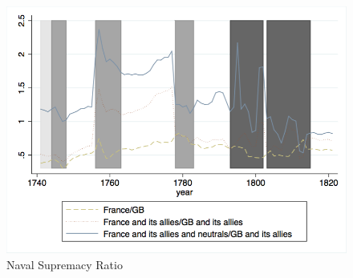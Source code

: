 \documentclass[12pt,a4paper,notitlepage,english]{article}
\begin{document}
\begin{center}
\begin{figure}[H]
\caption{Naval Supremacy Ratio}
\label{naval_supremacy_ratios}
\includegraphics[scale=.51]{naval_supremacy_ratios.png}
\end{figure}
\end{center}
\end{document}
